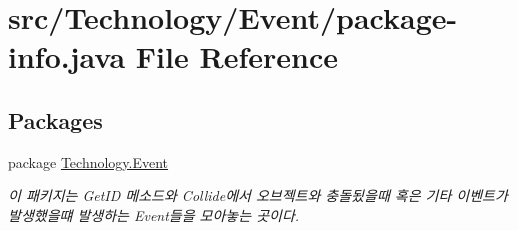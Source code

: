 \hypertarget{_technology_2_event_2package-info_8java}{\section{src/\-Technology/\-Event/package-\/info.java File Reference}
\label{_technology_2_event_2package-info_8java}
}
\subsection*{Packages}
\begin{DoxyCompactItemize}
\item 
package \hyperlink{namespace_technology_1_1_event}{Technology.\-Event}
\begin{DoxyCompactList}\small\item\em 이 패키지는 Get\-I\-D 메소드와 Collide에서 오브젝트와 충돌됬을때 혹은 기타 이벤트가 발생했을떄 발생하는 Event들을 모아놓는 곳이다. \end{DoxyCompactList}\end{DoxyCompactItemize}
